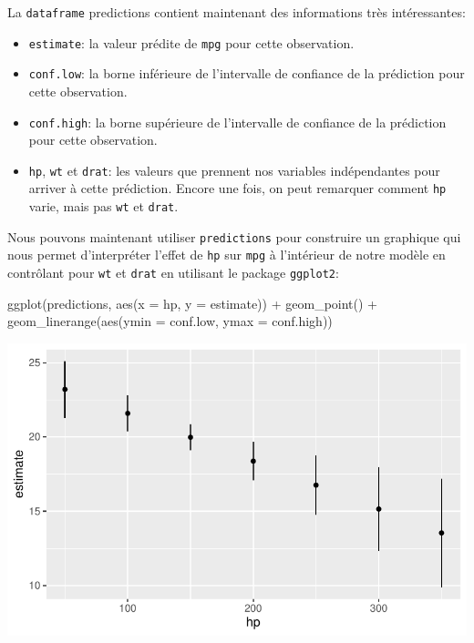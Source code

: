 \documentclass[
  letterpaper,
  DIV=11,
  numbers=noendperiod]{scrreprt}
\newenvironment{Shaded}{\begin{snugshade}}{\end{snugshade}}
\newcommand{\AttributeTok}[1]{\textcolor[rgb]{0.40,0.45,0.13}{#1}}
\newcommand{\FunctionTok}[1]{\textcolor[rgb]{0.28,0.35,0.67}{#1}}
\newcommand{\NormalTok}[1]{\textcolor[rgb]{0.00,0.23,0.31}{#1}}
\newcommand{\SpecialCharTok}[1]{\textcolor[rgb]{0.37,0.37,0.37}{#1}}
\providecommand{\tightlist}{%
  \setlength{\itemsep}{0pt}\setlength{\parskip}{0pt}}\usepackage{longtable,booktabs,array}
\begin{document}
La \texttt{dataframe} predictions contient maintenant des informations
très intéressantes:

\begin{itemize}
\tightlist
\item
  \texttt{estimate}: la valeur prédite de \texttt{mpg} pour cette
  observation.
\item
  \texttt{conf.low}: la borne inférieure de l'intervalle de confiance de
  la prédiction pour cette observation.
\item
  \texttt{conf.high}: la borne supérieure de l'intervalle de confiance
  de la prédiction pour cette observation.
\item
  \texttt{hp}, \texttt{wt} et \texttt{drat}: les valeurs que prennent
  nos variables indépendantes pour arriver à cette prédiction. Encore
  une fois, on peut remarquer comment \texttt{hp} varie, mais pas
  \texttt{wt} et \texttt{drat}.
\end{itemize}

Nous pouvons maintenant utiliser \texttt{predictions} pour construire un
graphique qui nous permet d'interpréter l'effet de \texttt{hp} sur
\texttt{mpg} à l'intérieur de notre modèle en contrôlant pour
\texttt{wt} et \texttt{drat} en utilisant le package \texttt{ggplot2}:

\begin{Shaded}
\begin{Highlighting}[]
\FunctionTok{ggplot}\NormalTok{(predictions, }\FunctionTok{aes}\NormalTok{(}\AttributeTok{x =}\NormalTok{ hp, }\AttributeTok{y =}\NormalTok{ estimate)) }\SpecialCharTok{+}
      \FunctionTok{geom\_point}\NormalTok{() }\SpecialCharTok{+}
      \FunctionTok{geom\_linerange}\NormalTok{(}\FunctionTok{aes}\NormalTok{(}\AttributeTok{ymin =}\NormalTok{ conf.low, }\AttributeTok{ymax =}\NormalTok{ conf.high))}
\end{Highlighting}
\end{Shaded}

\includegraphics{chapitre_6_files/figure-pdf/unnamed-chunk-12-1.pdf}
\end{document}
